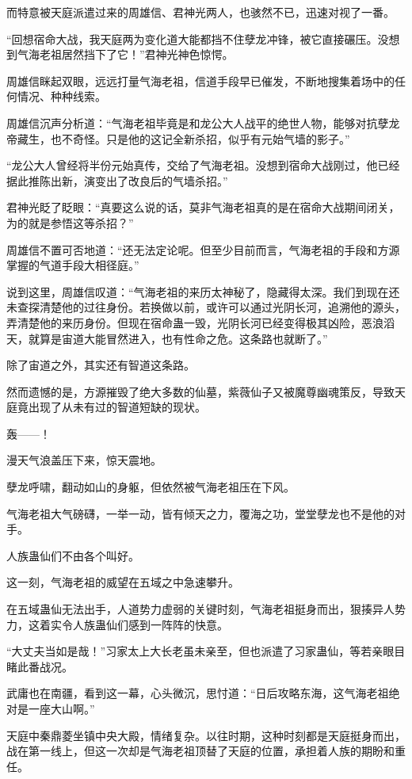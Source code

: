 \begin{this_body}
而特意被天庭派遣过来的周雄信、君神光两人，也骇然不已，迅速对视了一番。

“回想宿命大战，我天庭两为变化道大能都挡不住孽龙冲锋，被它直接碾压。没想到气海老祖居然挡下了它！”君神光神色惊愕。

周雄信眯起双眼，远远打量气海老祖，信道手段早已催发，不断地搜集着场中的任何情况、种种线索。

周雄信沉声分析道：“气海老祖毕竟是和龙公大人战平的绝世人物，能够对抗孽龙帝藏生，也不奇怪。只是他的这记全新杀招，似乎有元始气墙的影子。”

“龙公大人曾经将半份元始真传，交给了气海老祖。没想到宿命大战刚过，他已经据此推陈出新，演变出了改良后的气墙杀招。”

君神光眨了眨眼：“真要这么说的话，莫非气海老祖真的是在宿命大战期间闭关，为的就是参悟这等杀招？”

周雄信不置可否地道：“还无法定论呢。但至少目前而言，气海老祖的手段和方源掌握的气道手段大相径庭。”

说到这里，周雄信叹道：“气海老祖的来历太神秘了，隐藏得太深。我们到现在还未查探清楚他的过往身份。若换做以前，或许可以通过光阴长河，追溯他的源头，弄清楚他的来历身份。但现在宿命蛊一毁，光阴长河已经变得极其凶险，恶浪滔天，就算是宙道大能冒然进入，也有性命之危。这条路也就断了。”

除了宙道之外，其实还有智道这条路。

然而遗憾的是，方源摧毁了绝大多数的仙墓，紫薇仙子又被魔尊幽魂策反，导致天庭竟出现了从未有过的智道短缺的现状。

轰——！

漫天气浪盖压下来，惊天震地。

孽龙呼啸，翻动如山的身躯，但依然被气海老祖压在下风。

气海老祖大气磅礴，一举一动，皆有倾天之力，覆海之功，堂堂孽龙也不是他的对手。

人族蛊仙们不由各个叫好。

这一刻，气海老祖的威望在五域之中急速攀升。

在五域蛊仙无法出手，人道势力虚弱的关键时刻，气海老祖挺身而出，狠揍异人势力，这着实令人族蛊仙们感到一阵阵的快意。

“大丈夫当如是哉！”习家太上大长老虽未亲至，但也派遣了习家蛊仙，等若亲眼目睹此番战况。

武庸也在南疆，看到这一幕，心头微沉，思忖道：“日后攻略东海，这气海老祖绝对是一座大山啊。”

天庭中秦鼎菱坐镇中央大殿，情绪复杂。以往时期，这种时刻都是天庭挺身而出，战在第一线上，但这一次却是气海老祖顶替了天庭的位置，承担着人族的期盼和重任。


\end{this_body}
